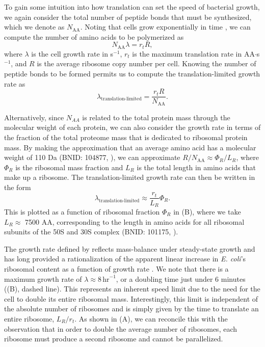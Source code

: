 To gain some intuition into how translation can set the speed of
bacterial growth, we again consider the total number of peptide bonds that must
be synthesized, which we denote as $N_\text{AA}$. Noting that cells grow exponentially in time
\citep{godin2010}, we can compute the number of amino acids to be polymerized as
\begin{equation} 
    N_\text{AA} \lambda = r_t R, 
\end{equation} where
$\lambda$ is the cell growth rate in s$^{-1}$, $r_t$ is the maximum translation
rate in AA$\cdot$s$^{-1}$, and $R$ is the average ribosome copy number per
cell. Knowing the number of peptide bonds to be formed permits us to compute the
translation-limited growth rate as
\begin{equation}
\lambda_\text{translation-limited} = \frac{r_t R}{N_\text{AA}}.
\end{equation}

Alternatively, since $N_{AA}$ is related to the total protein mass through the
molecular weight of each protein, we can also consider the growth rate in terms
of the fraction of the total proteome mass that is dedicated to ribosomal
protein mass. By making the approximation that an average amino acid has a
molecular weight of 110 Da (BNID: 104877, \cite{milo2010}), we can approximate  $R
/ N_\text{AA} \approx \Phi_R / L_R$,  where $\Phi_R$ is the ribosomal mass
fraction and $L_R$ is the total length in amino acids that make up a ribosome.
The translation-limited growth rate can then be written in the form 
\begin{equation}
\lambda_{\textrm{translation-limited}} \approx \frac{r_t}{L_R}  \Phi_R.
\label{eq:translation_limit_growth_rate}
\end{equation}
This is plotted as a function of ribosomal fraction $\Phi_R$ in
(B), where we take $L_R \approx$ 7500 AA, corresponding to
the length in amino acids for all ribosomal subunits of the 50S and 30S complex
(BNID: 101175, \citep{milo2010}).

The growth rate defined by 
reflects mass-balance under steady-state growth and has long provided a
rationalization of the apparent linear increase in \textit{E. coli}'s ribosomal
content as a function of growth rate \citep{Goldberger1979, scott2010}. 
We note that there is a maximum growth rate of $\lambda \approx 8
\,\text{hr}^{-1}$, or a doubling time just under 6 minutes
((B), dashed line). This represents an inherent speed limit
due to the need for the cell to double its entire ribosomal mass. Interestingly,
this limit is independent of the absolute number of ribosomes and is simply
given by the time to translate an entire ribosome, $L_R/ r_t$. As shown in
(A), we can reconcile this with the observation that in
order to double the average number of ribosomes, each ribosome must produce a
second ribosome and cannot be parallelized.

